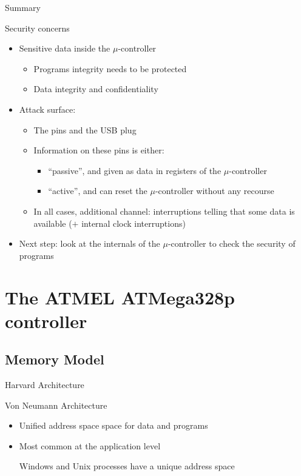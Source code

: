 \begin{reveals}
\begin{frame}[c]{Summary}
  \begin{block}{Security concerns}
    \begin{itemize}
    \item Sensitive data inside the \(\mu\)-controller
      \begin{itemize}
      \item Programs integrity needs to be protected
      \item Data integrity and confidentiality
      \end{itemize}
    \item Attack surface:
      \begin{itemize}
      \item The pins and the USB plug
      \item Information on these pins is either:
        \begin{itemize}
        \item ``passive'', and given as data in registers of the
          \(\mu\)-controller
        \item ``active'', and can reset the \(\mu\)-controller without
          any recourse
        \end{itemize}
      \item In all cases, additional channel: interruptions telling
        that some data is available (\(+\) internal clock
        interruptions)
      \end{itemize}
    \item Next step: look at the internals of the \(\mu\)-controller
      to check the security of programs
    \end{itemize}
  \end{block}

\end{frame}


\section{The ATMEL ATMega328p controller}


\subsection{Memory Model}

\begin{frame}[c]{Harvard Architecture}
  
  \begin{block}{Von Neumann Architecture}
    \begin{itemize}
    \item Unified address space space for data and programs
    \item Most common at the application level
      \begin{center}
        Windows and Unix processes have a unique address space
      \end{center}
    \end{itemize}
  \end{block}


\end{frame}
\end{reveals}
